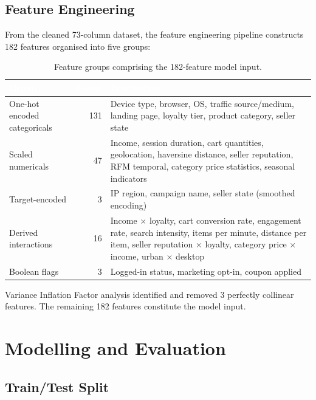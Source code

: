\documentclass[11pt,a4paper]{article}
\begin{document}
\subsection{Feature Engineering}

From the cleaned 73-column dataset, the feature engineering pipeline constructs
182 features organised into five groups:

\begin{table}[H]
\centering
\small
{}
\begin{tabularx}{\textwidth}{l r X}
\toprule
\rowcolor{tablehead}
\textcolor{white}{\textbf{Group}} & \textcolor{white}{\textbf{Count}} & \textcolor{white}{\textbf{Description}} \\
\midrule
One-hot encoded categoricals & 131 & Device type, browser, OS, traffic source/medium, landing page, loyalty tier, product category, seller state \\
Scaled numericals & 47 & Income, session duration, cart quantities, geolocation, haversine distance, seller reputation, RFM temporal, category price statistics, seasonal indicators \\
Target-encoded & 3 & IP region, campaign name, seller state (smoothed encoding) \\
Derived interactions & 16 & Income $\times$ loyalty, cart conversion rate, engagement rate, search intensity, items per minute, distance per item, seller reputation $\times$ loyalty, category price $\times$ income, urban $\times$ desktop \\
Boolean flags & 3 & Logged-in status, marketing opt-in, coupon applied \\
\bottomrule
\end{tabularx}
\caption{Feature groups comprising the 182-feature model input.}
\label{tab:features}
\end{table}

Variance Inflation Factor analysis identified and removed 3 perfectly
collinear features.  The remaining 182 features constitute the model input.

\section{Modelling and Evaluation}
\label{sec:model}

\subsection{Train/Test Split}
\end{document}
